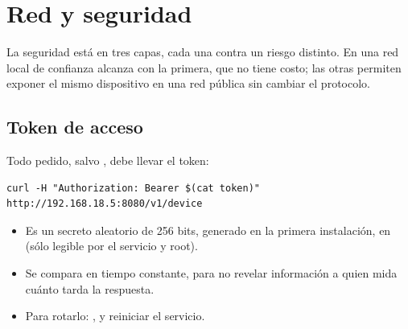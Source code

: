 \chapter{Red y seguridad}\label{cap:seguridad}

La seguridad está en tres capas, cada una contra un riesgo distinto. En una
red local de confianza alcanza con la primera, que no tiene costo; las otras
permiten exponer el mismo dispositivo en una red pública sin cambiar el
protocolo.

\begin{center}
\end{center}

\section{Token de acceso}

Todo pedido, salvo , debe llevar el token:

\begin{lstlisting}[language=shell]
curl -H "Authorization: Bearer $(cat token)" http://192.168.18.5:8080/v1/device
\end{lstlisting}

\begin{itemize}
  \item Es un secreto aleatorio de 256 bits, generado en la primera
    instalación, en  (sólo legible por el servicio
    y root).
  \item Se compara en tiempo constante, para no revelar información a quien
    mida cuánto tarda la respuesta.
  \item Para rotarlo:
    , y reiniciar
    el servicio.
\end{itemize}

